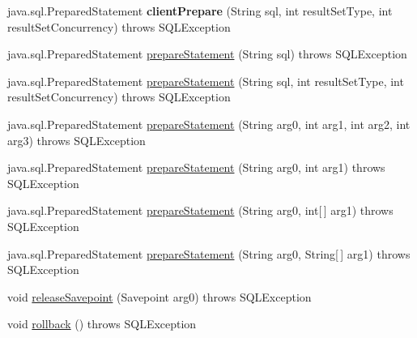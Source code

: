 \begin{DoxyCompactItemize}
\item 
\mbox{\label{classcom_1_1mysql_1_1jdbc_1_1jdbc2_1_1optional_1_1_connection_wrapper_a4701bb31725c0c65017a75b7b7de6aa3}} 
java.\+sql.\+Prepared\+Statement {\bfseries client\+Prepare} (String sql, int result\+Set\+Type, int result\+Set\+Concurrency)  throws S\+Q\+L\+Exception 
\item 
java.\+sql.\+Prepared\+Statement \mbox{\hyperlink{classcom_1_1mysql_1_1jdbc_1_1jdbc2_1_1optional_1_1_connection_wrapper_afbef35842f10c99af1e6f132d0a5950f}{prepare\+Statement}} (String sql)  throws S\+Q\+L\+Exception 
\item 
java.\+sql.\+Prepared\+Statement \mbox{\hyperlink{classcom_1_1mysql_1_1jdbc_1_1jdbc2_1_1optional_1_1_connection_wrapper_ae2d029665ab95f9f0db077f5227ac32f}{prepare\+Statement}} (String sql, int result\+Set\+Type, int result\+Set\+Concurrency)  throws S\+Q\+L\+Exception 
\item 
java.\+sql.\+Prepared\+Statement \mbox{\hyperlink{classcom_1_1mysql_1_1jdbc_1_1jdbc2_1_1optional_1_1_connection_wrapper_a661a65ea718a5d69493ea70ae86f1635}{prepare\+Statement}} (String arg0, int arg1, int arg2, int arg3)  throws S\+Q\+L\+Exception 
\item 
java.\+sql.\+Prepared\+Statement \mbox{\hyperlink{classcom_1_1mysql_1_1jdbc_1_1jdbc2_1_1optional_1_1_connection_wrapper_af87c52270af5085b5bb48c65cc550ea8}{prepare\+Statement}} (String arg0, int arg1)  throws S\+Q\+L\+Exception 
\item 
java.\+sql.\+Prepared\+Statement \mbox{\hyperlink{classcom_1_1mysql_1_1jdbc_1_1jdbc2_1_1optional_1_1_connection_wrapper_a2b8b8b50314fce82cbc19a48b85bd869}{prepare\+Statement}} (String arg0, int\mbox{[}$\,$\mbox{]} arg1)  throws S\+Q\+L\+Exception 
\item 
java.\+sql.\+Prepared\+Statement \mbox{\hyperlink{classcom_1_1mysql_1_1jdbc_1_1jdbc2_1_1optional_1_1_connection_wrapper_a0c9da719ebed2d887039d1838214fd18}{prepare\+Statement}} (String arg0, String\mbox{[}$\,$\mbox{]} arg1)  throws S\+Q\+L\+Exception 
\item 
void \mbox{\hyperlink{classcom_1_1mysql_1_1jdbc_1_1jdbc2_1_1optional_1_1_connection_wrapper_abb0563ed9623e1aeae749d51a86b5244}{release\+Savepoint}} (Savepoint arg0)  throws S\+Q\+L\+Exception 
\item 
void \mbox{\hyperlink{classcom_1_1mysql_1_1jdbc_1_1jdbc2_1_1optional_1_1_connection_wrapper_a970363042f006042fefc3c7a3f2d93f1}{rollback}} ()  throws S\+Q\+L\+Exception 

\end{DoxyCompactItemize}
